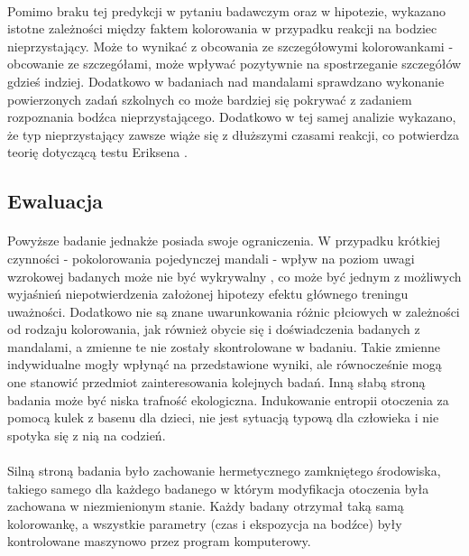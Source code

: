 \documentclass[12pt,a4paper,final,oneside,onecolumn,titlepage]{article}
\begin{document}
\paragraph{}
Pomimo braku tej predykcji w pytaniu badawczym oraz w hipotezie, wykazano istotne zależności między faktem kolorowania w przypadku reakcji na bodziec nieprzystający. Może to wynikać z obcowania ze szczegółowymi kolorowankami - obcowanie ze szczegółami, może wpływać pozytywnie na spostrzeganie szczegółów gdzieś indziej. Dodatkowo w badaniach nad mandalami sprawdzano wykonanie powierzonych zadań szkolnych \citep{carsley_effectiveness_2018} co może bardziej się pokrywać z zadaniem rozpoznania bodźca nieprzystającego. Dodatkowo w tej samej analizie wykazano, że typ nieprzystający zawsze wiąże się z dłuższymi czasami reakcji, co potwierdza teorię dotyczącą testu Eriksena \citep{sanders_eriksen_2002}.
\subsection*{\normalsize{\textbf{Ewaluacja}}}
\paragraph{}
Powyższe badanie jednakże posiada swoje ograniczenia. W przypadku krótkiej czynności - pokolorowania pojedynczej mandali - wpływ na poziom uwagi wzrokowej badanych może nie być wykrywalny \citep{thompson_influence_2021}, co może być jednym z możliwych wyjaśnień niepotwierdzenia założonej hipotezy efektu głównego treningu uważności. Dodatkowo nie są znane uwarunkowania różnic płciowych w zależności od rodzaju kolorowania, jak również obycie się i doświadczenia badanych z mandalami, a zmienne te nie zostały skontrolowane w badaniu. Takie zmienne indywidualne mogły wpłynąć na przedstawione wyniki, ale równocześnie mogą one stanowić przedmiot zainteresowania kolejnych badań. Inną słabą stroną badania może być niska trafność ekologiczna. Indukowanie entropii otoczenia za pomocą kulek z basenu dla dzieci, nie jest sytuacją typową dla człowieka i nie spotyka się z nią na codzień.
\paragraph{}
Silną stroną badania było zachowanie hermetycznego zamkniętego środowiska, takiego samego dla każdego badanego w którym modyfikacja otoczenia była zachowana w niezmienionym stanie. Każdy badany otrzymał taką samą kolorowankę, a wszystkie parametry (czas i ekspozycja na bodźce) były kontrolowane maszynowo przez program komputerowy.
\newpage

\newpage
\end{document}

